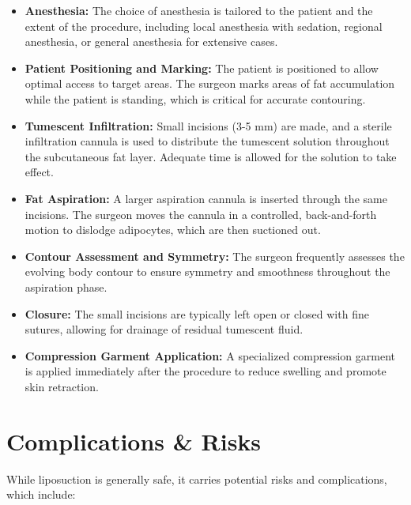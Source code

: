 \begin{itemize}
  \item \textbf{Anesthesia:} The choice of anesthesia is tailored to the patient and the extent of the procedure, including local anesthesia with sedation, regional anesthesia, or general anesthesia for extensive cases.
  
  \item \textbf{Patient Positioning and Marking:} The patient is positioned to allow optimal access to target areas. The surgeon marks areas of fat accumulation while the patient is standing, which is critical for accurate contouring.

  \item \textbf{Tumescent Infiltration:} Small incisions (3-5 mm) are made, and a sterile infiltration cannula is used to distribute the tumescent solution throughout the subcutaneous fat layer. Adequate time is allowed for the solution to take effect.

  \item \textbf{Fat Aspiration:} A larger aspiration cannula is inserted through the same incisions. The surgeon moves the cannula in a controlled, back-and-forth motion to dislodge adipocytes, which are then suctioned out.

  \item \textbf{Contour Assessment and Symmetry:} The surgeon frequently assesses the evolving body contour to ensure symmetry and smoothness throughout the aspiration phase.

  \item \textbf{Closure:} The small incisions are typically left open or closed with fine sutures, allowing for drainage of residual tumescent fluid.

  \item \textbf{Compression Garment Application:} A specialized compression garment is applied immediately after the procedure to reduce swelling and promote skin retraction.
\end{itemize}

\section*{Complications \& Risks}
While liposuction is generally safe, it carries potential risks and complications, which include:

